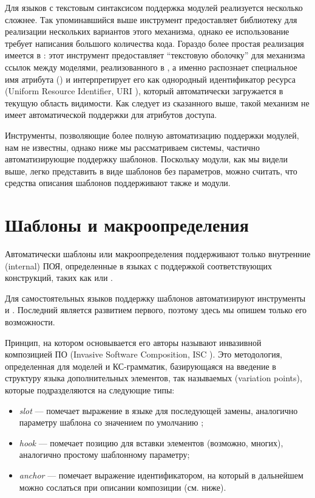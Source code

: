 Для языков с текстовым синтаксисом поддержка модулей реализуется несколько сложнее. Так упоминавшийся выше инструмент  \cite{???} предоставляет библиотеку для реализации нескольких вариантов этого механизма, однако ее использование требует написания большого количества кода. Гораздо более простая реализация имеется в  \cite{???}: этот инструмент предоставляет ``текстовую оболочку'' для механизма ссылок между моделями, реализованного в , а именно распознает специальное имя атрибута () и интерпретирует его как однородный идентификатор ресурса (Uniform Resource Identifier, URI \cite{???}), который автоматически загружается в текущую область видимости. Как следует из сказанного выше, такой механизм не имеет автоматической поддержки для атрибутов доступа.

Инструменты, позволяющие более полную автоматизацию поддержки модулей, нам не известны, однако ниже мы рассматриваем системы, частично автоматизирующие поддержку шаблонов. Поскольку модули, как мы видели выше, легко представить в виде шаблонов без параметров, можно считать, что средства описания шаблонов поддерживают также и модули.

\section{Шаблоны и макроопределения}

Автоматически шаблоны или макроопределения поддерживают только внутренние (internal) ПОЯ, определенные в языках с поддержкой соответствующих конструкций, таких как  или .

Для самостоятельных языков поддержку шаблонов автоматизируют инструменты  \cite{???} и  \cite{???}. Последний является развитием первого, поэтому здесь мы опишем только его возможности.
 
Принцип, на котором основывается  его авторы называют инвазивной композицией ПО (Invasive Software Composition, ISC \cite{???}). Это методология, определенная для моделей и КС-грамматик, базирующаяся на введение в структуру языка дополнительных элементов, так называемых  (variation points), которые подразделяются на следующие типы:
\begin{itemize}
\item \emph{slot} --- помечает выражение в языке для последующей замены, аналогично параметру шаблона со значением по умолчанию \cite{Cpp};
\item \emph{hook} --- помечает позицию для вставки элементов (возможно, многих), аналогично простому шаблонному параметру;
\item \emph{anchor} --- помечает выражение идентификатором, на который в дальнейшем можно сослаться при описании композиции (см. ниже).
\end{itemize}

